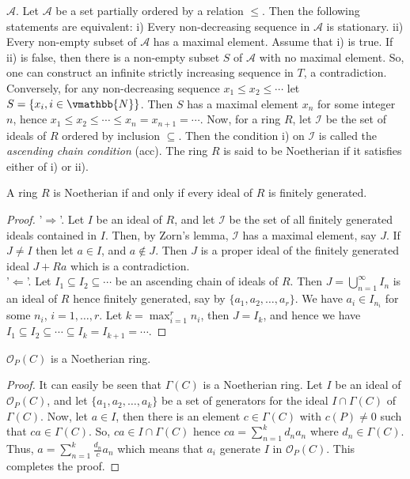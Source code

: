 $\mathcal{A}$. Let $\mathcal{A}$ be a set partially ordered by a relation $\le$. Then the following 
statements are equivalent: i) Every non-decreasing sequence in $\mathcal{A}$ is stationary. ii) 
Every non-empty subset of $\mathcal{A}$ has a maximal element. Assume that i) is true. If ii) is 
false, then there is a non-empty subset $S$ of $\mathcal{A}$ with no maximal element. So, one can 
construct an infinite strictly increasing sequence in $T$, a contradiction. Conversely, for any 
non-decreasing sequence $x_1 \le x_2 \le \cdots$ let $S = \{ x_i, i \in \vmathbb{N} \}$. Then $S$ has 
a maximal element $x_n$ for some integer $n$, hence $x_1 \le x_2 \le \cdots \le x_n = x_{n + 1} = 
\cdots$. Now, for a ring $R$, let $\mathscr{I}$ be the set of ideals of $R$ ordered by inclusion 
$\subseteq$. Then the condition i) on $\mathscr{I}$ is called the \textit{ascending chain condition} 
(acc). The ring $R$ is said to be Noetherian if it satisfies either of i) or ii).
\begin{proposition}
A ring $R$ is Noetherian if and only if every ideal of $R$ is finitely generated.
\end{proposition}
\begin{proof}
'$\Rightarrow$'. Let $I$ be an ideal of $R$, and let $\mathscr{I}$ be the set of all finitely 
generated ideals contained in $I$. Then, by Zorn's lemma, $\mathscr{I}$ has a maximal element, say 
$J$. If $J \ne I$ then let $a \in I$, and $a \notin J$. Then $J$ is a proper ideal of the finitely 
generated ideal $J + Ra$ which is a contradiction. \\
'$\Leftarrow$'. Let $I_1 \subseteq I_2 \subseteq \cdots$ be an ascending chain of ideals of $R$. 
Then $J = \bigcup_{n = 1}^\infty I_n$ is an ideal of $R$ hence finitely generated, say by $\{ a_1, 
a_2, \dots, a_r \}$. We have $a_i \in I_{n_i}$ for some $n_i$, $i = 1 , \dots, r$. Let $k = \max_{i 
= 1}^r n_i$, then $J = I_k$, and hence we have $I_1 \subseteq I_2 \subseteq \cdots \subseteq I_k = 
I_{k + 1} = \cdots$.
\end{proof}
\begin{proposition}
$\mathcal{O}_P(C)$ is a Noetherian ring.
\end{proposition}
\begin{proof}
It can easily be seen that $\Gamma(C)$ is a Noetherian ring. Let $I$ be an ideal of 
$\mathcal{O}_P(C)$, and let $\{ a_1, a_2, \dots, a_k \}$ be a set of generators for the ideal $I 
\cap \Gamma(C)$ of $\Gamma(C)$. Now, let $a \in I$, then there is an element $c \in \Gamma(C)$ with 
$c(P) \ne 0$ such that $ca \in \Gamma(C)$. So, $ca \in I \cap \Gamma(C)$ hence $ca = \sum_{n = 1}^k 
d_na_n$ where $d_n \in \Gamma(C)$. Thus, $a = \sum_{n = 1}^k \frac{d_n}{c}a_n$ which means that 
$a_i$ generate $I$ in $\mathcal{O}_P(C)$. This completes the proof.
\end{proof}
